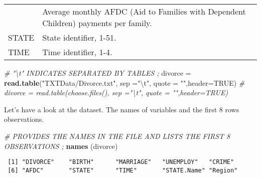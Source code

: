 \documentclass[]{book}
\newenvironment{Shaded}{\begin{snugshade}}{\end{snugshade}}
\newcommand{\CharTok}[1]{\textcolor[rgb]{0.31,0.60,0.02}{#1}}
\newcommand{\CommentTok}[1]{\textcolor[rgb]{0.56,0.35,0.01}{\textit{#1}}}
\newcommand{\DataTypeTok}[1]{\textcolor[rgb]{0.13,0.29,0.53}{#1}}
\newcommand{\KeywordTok}[1]{\textcolor[rgb]{0.13,0.29,0.53}{\textbf{#1}}}
\newcommand{\NormalTok}[1]{#1}
\newcommand{\OtherTok}[1]{\textcolor[rgb]{0.56,0.35,0.01}{#1}}
\newcommand{\StringTok}[1]{\textcolor[rgb]{0.31,0.60,0.02}{#1}}
\begin{document}
\begin{longtable}[]{@{}ll@{}}
\begin{minipage}[t]{0.06\columnwidth}
\end{minipage} & \begin{minipage}[t]{0.88\columnwidth}\raggedright
Average monthly AFDC (Aid to Families with Dependent Children) payments per family.\strut
\end{minipage}\tabularnewline
\begin{minipage}[t]{0.06\columnwidth}\raggedright
STATE\strut
\end{minipage} & \begin{minipage}[t]{0.88\columnwidth}\raggedright
State identifier, 1-51.\strut
\end{minipage}\tabularnewline
\begin{minipage}[t]{0.06\columnwidth}\raggedright
TIME\strut
\end{minipage} & \begin{minipage}[t]{0.88\columnwidth}\raggedright
Time identifier, 1-4.\strut
\end{minipage}\tabularnewline
\bottomrule
\end{longtable}

\begin{Shaded}
\begin{Highlighting}[]
\CommentTok{#  "\textbackslash{}t"  INDICATES SEPARATED BY TABLES  ;}
\NormalTok{divorce =}\StringTok{ }\KeywordTok{read.table}\NormalTok{(}\StringTok{"TXTData/Divorce.txt"}\NormalTok{, }\DataTypeTok{sep =}\StringTok{"}\CharTok{\textbackslash{}t}\StringTok{"}\NormalTok{, }\DataTypeTok{quote =} \StringTok{""}\NormalTok{,}\DataTypeTok{header=}\OtherTok{TRUE}\NormalTok{)}
\CommentTok{# divorce = read.table(choose.files(), sep ="\textbackslash{}t", quote = "",header=TRUE)}
\end{Highlighting}
\end{Shaded}

Let's have a look at the dataset. The names of variables and the first 8 rows observations.

\begin{Shaded}
\begin{Highlighting}[]
\CommentTok{#  PROVIDES THE NAMES IN THE FILE AND LISTS THE FIRST 8 OBSERVATIONS  ;}
\KeywordTok{names}\NormalTok{ (divorce)}
\end{Highlighting}
\end{Shaded}

\begin{verbatim}
 [1] "DIVORCE"    "BIRTH"      "MARRIAGE"   "UNEMPLOY"   "CRIME"     
 [6] "AFDC"       "STATE"      "TIME"       "STATE.Name" "Region"    
\end{verbatim}
\end{document}
